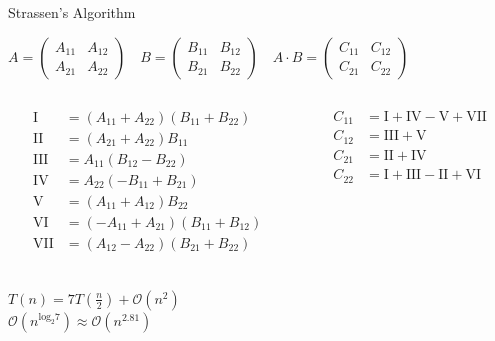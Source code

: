 \documentclass[UKenglish]{beamer}
\begin{document}
\begin{frame}[c]{Strassen’s Algorithm}
    \begin{center}
        $A=
            \begin{pmatrix}
                A_{11} & A_{12} \\
                A_{21} & A_{22}
            \end{pmatrix}
            \quad
            B=
            \begin{pmatrix}
                B_{11} & B_{12} \\
                B_{21} & B_{22}
            \end{pmatrix}
            \quad
            A \cdot B =
            \begin{pmatrix}
                C_{11} & C_{12} \\
                C_{21} & C_{22}
            \end{pmatrix}
        $
    \end{center}
    \pause
    \footnotesize
    \begin{columns}[onlytextwidth]
        \begin{column}{0.49\textwidth}
            \begin{align*}
                \mathrm{I}   & = (A_{11}+A_{22})(B_{11}+B_{22})  \\
                \mathrm{II}  & = (A_{21}+A_{22})B_{11}           \\
                \mathrm{III} & = A_{11}(B_{12}-B_{22})           \\
                \mathrm{IV}  & = A_{22}(-B_{11}+B_{21})          \\
                \mathrm{V}   & = (A_{11}+A_{12})B_{22}           \\
                \mathrm{VI}  & = (-A_{11}+A_{21})(B_{11}+B_{12}) \\
                \mathrm{VII} & = (A_{12}-A_{22})(B_{21}+B_{22})  \\
            \end{align*}
        \end{column}
        \begin{column}{0.49\textwidth}
            \vfill
            \begin{align*}
                C_{11} & = \mathrm{I} + \mathrm{IV} - \mathrm{V} + \mathrm{VII}  \\
                C_{12} & = \mathrm{III} + \mathrm{V}                             \\
                C_{21} & = \mathrm{II} + \mathrm{IV}                             \\
                C_{22} & = \mathrm{I} + \mathrm{III} - \mathrm{II} + \mathrm{VI}
            \end{align*}
        \end{column}
    \end{columns}
    \pause
    \begin{center}
        $T(n)=7T(\frac{n}{2})+\mathcal{O}(n^2)$ \\ \vfill
        \pause
        $\mathcal{O}(n^{\text{log}_2 7}) \approx \mathcal{O}(n^{2.81})$
    \end{center}
\end{frame}
\end{document}
